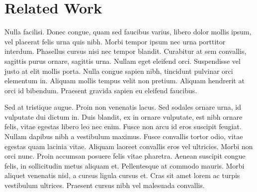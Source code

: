 \section{Related Work}
\label{sec:related}
Nulla facilisi. Donec congue, quam sed faucibus varius, libero dolor mollis ipsum, vel placerat felis urna quis nibh. Morbi tempor ipsum nec urna porttitor interdum. Phasellus cursus nisi nec tempor blandit. Curabitur at sem convallis, sagittis purus ornare, sagittis urna. Nullam eget eleifend orci. Suspendisse vel justo at elit mollis porta. Nulla congue sapien nibh, tincidunt pulvinar orci elementum in. Aliquam mollis tempus velit non pretium. Aliquam hendrerit at orci id bibendum. Praesent gravida sapien eu eleifend faucibus.

Sed at tristique augue. Proin non venenatis lacus. Sed sodales ornare urna, id vulputate dui dictum in. Duis blandit, ex in ornare vulputate, est nibh ornare felis, vitae egestas libero leo nec enim. Fusce non arcu id eros suscipit feugiat. Nullam dapibus nibh a vestibulum maximus. Fusce convallis tortor odio, vitae egestas quam lacinia vitae. Aliquam laoreet convallis eros vel ultricies. Morbi non orci nunc. Proin accumsan posuere felis vitae pharetra. Aenean suscipit congue felis, in sollicitudin metus aliquam et. Pellentesque at commodo mauris. Morbi aliquet venenatis nisl, a cursus ligula cursus et. Cras sit amet lorem ac turpis vestibulum ultrices. Praesent cursus nibh vel malesuada convallis. 